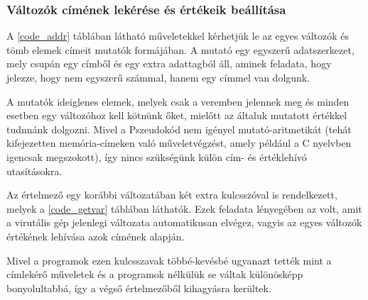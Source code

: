 \subsubsection{Változók címének lekérése és értékeik beállítása}


A \ref{code_addr} táblában látható műveletekkel kérhetjük le az egyes változók és tömb elemek címeit mutatók formájában. A mutató egy egyszerű adatszerkezet, mely csupán egy címből és egy extra adattagból áll, aminek feladata, hogy jelezze, hogy nem egyszerű számmal, hanem egy címmel van dolgunk.

A mutatók ideiglenes elemek, melyek csak a veremben jelennek meg és minden esetben egy változóhoz kell kötnünk őket, mielőtt az általuk mutatott értékkel tudnnánk dolgozni. Mivel a Pszeudokód nem igényel mutató-aritmetikát (tehát kifejezetten memória-címeken való műveletvégzést, amely például a C nyelvben igencsak megszokott), így nincs szükségünk külön cím- és értéklehívó utasításokra.


Az értelmező egy korábbi változatában két extra kulcsszóval is rendelkezett, melyek a \ref{code_getvar} táblában láthatók. Ezek feladata lényegében az volt, amit a virutális gép jelenlegi változata automatikusan elvégez, vagyis az egyes változók értékének lehívása azok címének alapján.

Mivel a programok ezen kulcsszavak többé-kevésbé ugyanazt tették mint a címlekérő műveletek és a programok nélkülük se váltak különösképp bonyolultabbá, így a végső értelmezőből kihagyásra kerültek.


